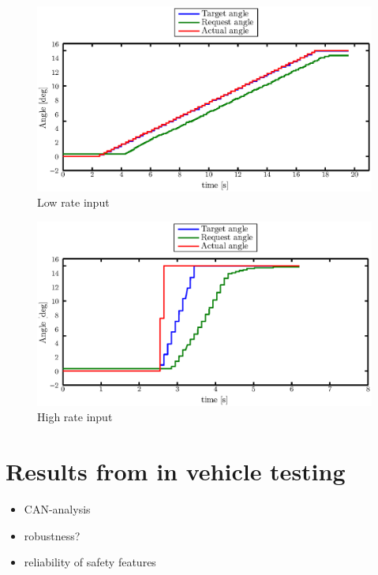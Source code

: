 \documentclass[ExampleMasters.tex]{subfiles}
\begin{document}
\begin{figure}[!hbt]
	\centering
	\includegraphics[width=1\linewidth]{figures/rate_limiter2}
	\caption{Low rate input}
	
	\label{fig:rate_limiter2}
\end{figure}

\begin{figure}[!hbt]
	\centering
	\includegraphics[width=1\linewidth]{figures/rate_limiter4}
	\caption{High rate input}
	
	\label{fig:rate_limiter4}
\end{figure}


\section{Results from in vehicle testing}
\label{sec:results_vehicle_testing}




\begin{itemize}
	\item CAN-analysis
	\item robustness?
	\item reliability of safety features
\end{itemize}
\end{document}
